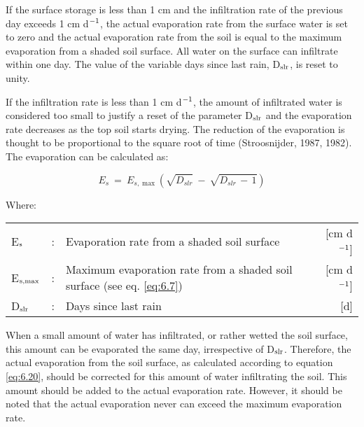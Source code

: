 If the surface storage is less than 1 cm and the infiltration rate of the previous day
exceeds 1 cm d$^{{\rm -1}}$, the actual evaporation rate from the surface water is set to zero and the
actual evaporation rate from the soil is equal to the maximum evaporation from a shaded
soil surface. All water on the surface can infiltrate within one day. The value of the
variable days since last rain, D$_{{\rm slr}}$, is reset to unity.

If the infiltration rate is less than 1 cm d$^{{\rm -1}}$, the amount of infiltrated water is considered
too small to justify a reset of the parameter D$_{{\rm slr}}$ and the evaporation rate decreases as the
top soil starts drying. The reduction of the evaporation is thought to be proportional to the
square root of time (Stroosnijder, 1987, 1982). The evaporation can be calculated as:

\begin{equation}
\label{eq:6.20}
E _{s} ~=~ E _{s,\max } ( \sqrt{D _{slr} } ~-~ \sqrt{D _{slr} \, -\, 1} )
\end{equation}

Where:\\[5pt]
\begin{tabularx}{\textwidth}{llXr}
E$_{{\rm s}}$ &:& Evaporation rate from a shaded soil surface  & [cm d$^{{\rm -1}}$]\\
E$_{{\rm s,max}}$ &:& Maximum evaporation rate from a shaded soil
   surface (see eq. \ref{eq:6.7})  & [cm d$^{{\rm -1}}$]\\
D$_{{\rm slr}}$ &:& Days since last rain  & [d]\\
\end{tabularx}

When a small amount of water has infiltrated, or rather wetted the soil surface, this
amount can be evaporated the same day, irrespective of D$_{{\rm slr}}$. Therefore, the actual
evaporation from the soil surface, as calculated according to equation \ref{eq:6.20}, should be
corrected for this amount of water infiltrating the soil. This amount should be added to
the actual evaporation rate. However, it should be noted that the actual evaporation never
can exceed the maximum evaporation rate.

